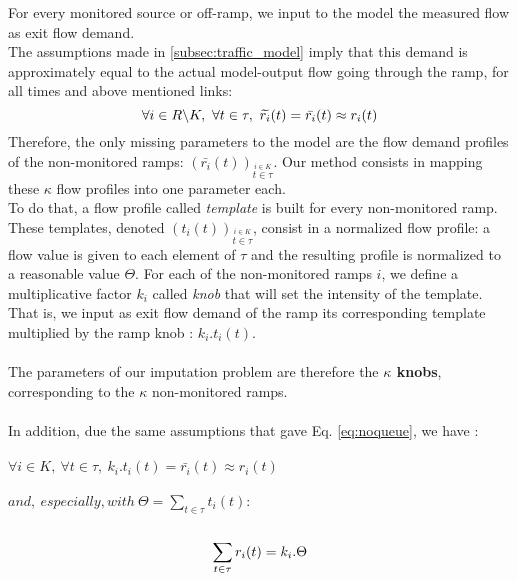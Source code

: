 For every monitored source or off-ramp, we input to the model the measured flow as exit flow demand.\\ The assumptions made in \ref{subsec:traffic_model} imply that this demand is approximately equal to the actual model-output flow going through the ramp, for all times and above mentioned links:\\
\begin{equation}
	\label{eq:noqueue}
	\forall i\in R\backslash K,\ \forall t\in \tau,\ \widetilde{r_{i}}(t)=\bar{r_{i}}(t)\approx {r_{i}}(t)\\
\end{equation}
Therefore, the only missing parameters to the model are the flow demand profiles of the non-monitored ramps: $(\bar{r_{i}}(t))_{\stackrel{i\in K}{t \in{\tau}}}$.
Our method consists in mapping these $\kappa$ flow profiles into one parameter each.\\
To do that, a flow profile called \emph{template} is built for every non-monitored ramp. These templates, denoted $(t_{i}(t))_{\stackrel{i\in{K}}{t \in{\tau}}}$, consist in a normalized flow profile: a flow value is given to each element of $\tau$ and the resulting profile is normalized to a reasonable value $\Theta$.
For each of the non-monitored ramps $i$, we define a multiplicative factor $k_{i}$ called \emph{knob} that will set the intensity of the template. 
That is, we input as exit flow demand of the ramp its corresponding template multiplied by the ramp knob : $k_{i}.t_{i}(t)$.\\
\\
The parameters of our imputation problem are therefore the \textbf{$\kappa$ knobs}, corresponding to the $\kappa$ non-monitored ramps.\\
\\
In addition, due the same assumptions that gave Eq. \ref{eq:noqueue}, we have :\\
\\
$\forall i \in K,\ \forall t\in \tau,\ k_{i}.t_{i}(t)=\bar{r_{i}}(t)\approx r_{i}(t)$\\
\\
$and,\ especially, with\ \Theta=\sum\limits_{t\in\tau}t_{i}(t):$\\
\\
\begin{equation}
	\label{eq:noqueuetemplate}
	\sum\limits_{t \in \tau} r_{i}(t)=k_{i}.\Theta\\
\end{equation}